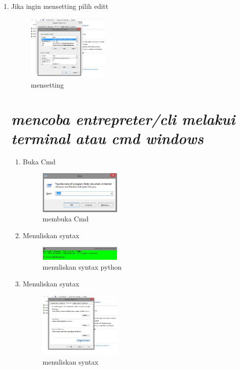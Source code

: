\begin{enumerate}
\item Jika ingin mensetting pilih editt
\begin{figure}[h]
\includegraphics[width=4cm]{figure/setting4.png}
\centering
\caption{mensetting}
\end{figure}

\section*{\textit{ mencoba entrepreter/cli melakui terminal atau cmd windows }}

\begin{enumerate}

\item Buka Cmd
\begin{figure}[hb]
\includegraphics[width=4cm]{figure/interpreter1.png}
\centering
\caption{membuka Cmd}
\end{figure}

\item Menuliskan syntax
\begin{figure}[hb]
\includegraphics[width=4cm]{figure/interpreter2.png}
\centering
\caption{menuliskan syntax python}
\end{figure}

\item Menuliskan syntax
\begin{figure}[hb]
\includegraphics[width=4cm]{figure/setting3.png}
\centering
\caption{menuliskan syntax}
\end{figure}


\end{enumerate}
\end{enumerate}
